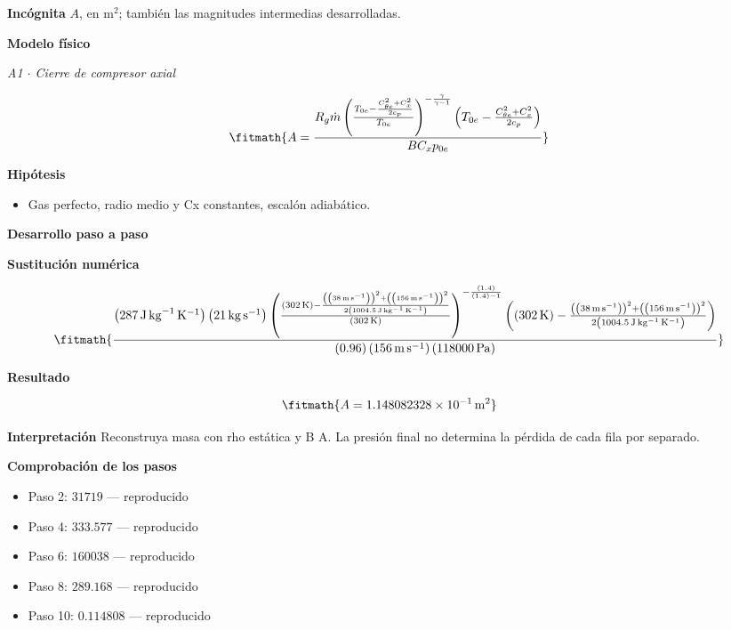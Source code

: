 \documentclass[10pt,openany]{book}
\begin{document}
\noindent\textbf{Incógnita}
$A$, en $\mathrm{m^{2}}$; también las magnitudes intermedias desarrolladas.

\noindent\textbf{Modelo físico}

\noindent\textit{A1 \(\cdot\) Cierre de compresor axial}

\[
\fitmath{A=\frac{R_g \dot m \left(\frac{T_{0e} - \frac{C_{\theta e}^{2} + C_x^{2}}{2 c_p}}{T_{0e}}\right)^{- \frac{\gamma}{\gamma - 1}} \left(T_{0e} - \frac{C_{\theta e}^{2} + C_x^{2}}{2 c_p}\right)}{B C_x p_{0e}}}
\]

\noindent\textbf{Hipótesis}
\begin{itemize}
\item Gas perfecto, radio medio y Cx constantes, escalón adiabático.
\end{itemize}

\noindent\textbf{Desarrollo paso a paso}



\noindent\textbf{Sustitución numérica}

\[
\fitmath{\frac{\left(287\,\mathrm{J}\,\mathrm{kg}^{-1}\,\mathrm{K}^{-1}\right) \left(21\,\mathrm{kg}\,\mathrm{s}^{-1}\right) \left(\frac{\left(302\,\mathrm{K}\right) - \frac{\left(\left(38\,\mathrm{m}\,\mathrm{s}^{-1}\right)\right)^{2} + \left(\left(156\,\mathrm{m}\,\mathrm{s}^{-1}\right)\right)^{2}}{2 \left(1004.5\,\mathrm{J}\,\mathrm{kg}^{-1}\,\mathrm{K}^{-1}\right)}}{\left(302\,\mathrm{K}\right)}\right)^{- \frac{\left(1.4\right)}{\left(1.4\right) - 1}} \left(\left(302\,\mathrm{K}\right) - \frac{\left(\left(38\,\mathrm{m}\,\mathrm{s}^{-1}\right)\right)^{2} + \left(\left(156\,\mathrm{m}\,\mathrm{s}^{-1}\right)\right)^{2}}{2 \left(1004.5\,\mathrm{J}\,\mathrm{kg}^{-1}\,\mathrm{K}^{-1}\right)}\right)}{\left(0.96\right) \left(156\,\mathrm{m}\,\mathrm{s}^{-1}\right) \left(118000\,\mathrm{Pa}\right)}}
\]

\noindent\textbf{Resultado}

\[
\fitmath{A=1.148082328\times10^{-1}\,\mathrm{m}^{2}}
\]

\noindent\textbf{Interpretación}
Reconstruya masa con rho estática y B A. La presión final no determina la pérdida de cada fila por separado.

\noindent\textbf{Comprobación de los pasos}
\begin{itemize}
\item Paso 2: $31719$ — reproducido
\item Paso 4: $333.577$ — reproducido
\item Paso 6: $160038$ — reproducido
\item Paso 8: $289.168$ — reproducido
\item Paso 10: $0.114808$ — reproducido
\end{itemize}
\end{document}
